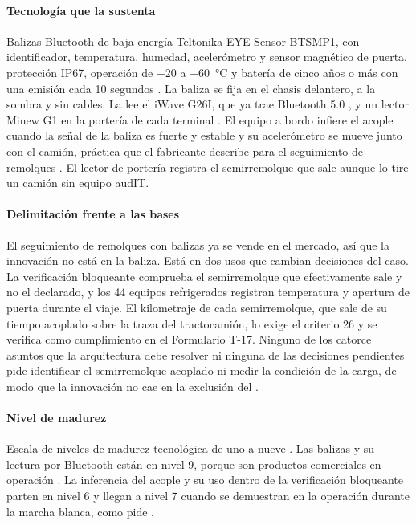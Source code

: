 \paragraph{Tecnología que la sustenta} Balizas Bluetooth de baja energía Teltonika EYE Sensor BTSMP1,
con identificador, temperatura, humedad, acelerómetro y sensor magnético de puerta, protección IP67,
operación de $-20$ a $+60$~°C y batería de cinco años o más con una emisión cada 10 segundos
\parencite{teltonika_eye}. La baliza se fija en el chasis delantero, a la sombra y sin cables. La lee
el iWave G26I, que ya trae Bluetooth 5.0 \parencite{iwave_g26i}, y un lector Minew G1 en la portería de
cada terminal \parencite{minew_g1}. El equipo a bordo infiere el acople cuando la señal de la baliza es
fuerte y estable y su acelerómetro se mueve junto con el camión, práctica que el fabricante describe
para el seguimiento de remolques \parencite{teltonika_trailer}. El lector de portería registra el
semirremolque que sale aunque lo tire un camión sin equipo audIT.

\paragraph{Delimitación frente a las bases} El seguimiento de remolques con balizas ya se vende en el
mercado, así que la innovación no está en la baliza. Está en dos usos que cambian decisiones del caso.
La verificación bloqueante comprueba el semirremolque que efectivamente sale y no el declarado, y los 44
equipos refrigerados registran temperatura y apertura de puerta durante el viaje. El kilometraje de
cada semirremolque, que sale de su tiempo acoplado sobre la traza del tractocamión, lo exige el criterio
26 y se verifica como cumplimiento en el Formulario T-17. Ninguno de los catorce asuntos que la arquitectura debe resolver  ni
ninguna de las decisiones pendientes  pide identificar el semirremolque
acoplado ni medir la condición de la carga, de modo que la innovación no cae en la exclusión del
.

\paragraph{Nivel de madurez} Escala de niveles de madurez tecnológica de uno a nueve
\parencite{iso16290}. Las balizas y su lectura por Bluetooth están en nivel 9, porque son productos
comerciales en operación \parencite{teltonika_eye,minew_g1}. La inferencia del acople y su uso dentro
de la verificación bloqueante parten en nivel 6 y llegan a nivel 7 cuando se demuestran en la operación
durante la marcha blanca, como pide .

